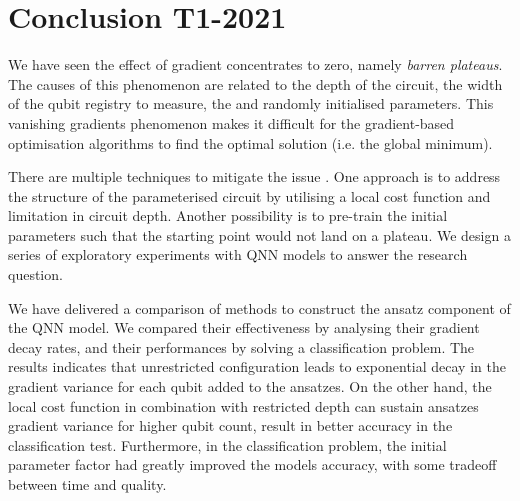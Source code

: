 \section{Conclusion T1-2021}
We have seen the effect of gradient concentrates to zero, namely \emph{barren plateaus}.
The causes of this phenomenon are related to the depth of the circuit, the width of the qubit registry to measure, the and randomly initialised parameters.
This vanishing gradients phenomenon makes it difficult for the gradient-based optimisation algorithms to find the optimal solution (i.e. the global minimum).

There are multiple techniques to mitigate the issue \cite{cerezoCostFunctionDependent2021, skolikLayerwiseLearningQuantum2021, grantInitializationStrategyAddressing2019}.
One approach is to address the structure of the parameterised circuit by utilising a local cost function and limitation in circuit depth.
Another possibility is to pre-train the initial parameters such that the starting point would not land on a plateau.
We design a series of exploratory experiments with QNN models to answer the research question.

We have delivered a comparison of methods to construct the ansatz component of the QNN model.
We compared their effectiveness by analysing their gradient decay rates, and their performances by solving a classification problem.
The results indicates that unrestricted configuration leads to exponential decay in the gradient variance for each qubit added to the ansatzes.
On the other hand, the local cost function in combination with restricted depth can sustain ansatzes gradient variance for higher qubit count, result in better accuracy in the classification test.
Furthermore, in the classification problem, the initial parameter factor had greatly improved the models accuracy, with some tradeoff between time and quality.



